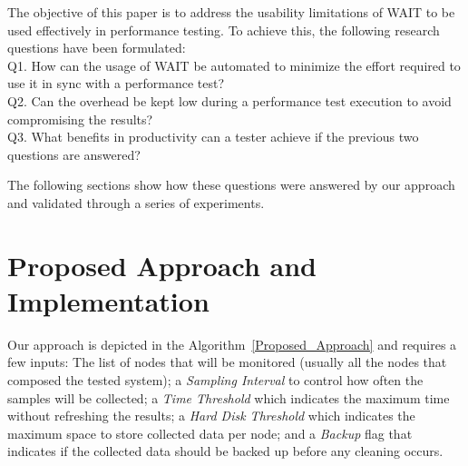 \documentclass[runningheads,a4paper]{llncs}
\begin{document}
The objective of this paper is to address the usability limitations of WAIT to
be used effectively in performance testing. To achieve this, the following
research questions have been formulated:
\\Q1. How can the usage of WAIT be automated to minimize the effort
required to use it in sync with a performance test?
\\Q2. Can the overhead be kept low during a performance test execution to avoid
compromising the results?
\\Q3. What benefits in productivity can a tester achieve if the previous
two questions are answered?

The following sections show how these questions were answered by our approach
and validated through a series of experiments.


\section{Proposed Approach and Implementation}


Our approach is depicted in the Algorithm~\ref{Proposed_Approach} and requires
a few inputs: The list of nodes that will be monitored (usually all the nodes
that composed the tested system); a \emph{Sampling Interval} to control how
often the samples will be collected; a \emph{Time Threshold} which indicates the
maximum time without refreshing the results; a \emph{Hard Disk Threshold} which
indicates the maximum space to store collected data per node; and a
\emph{Backup} flag that indicates if the collected data should be backed up
before any cleaning occurs.
\end{document}
